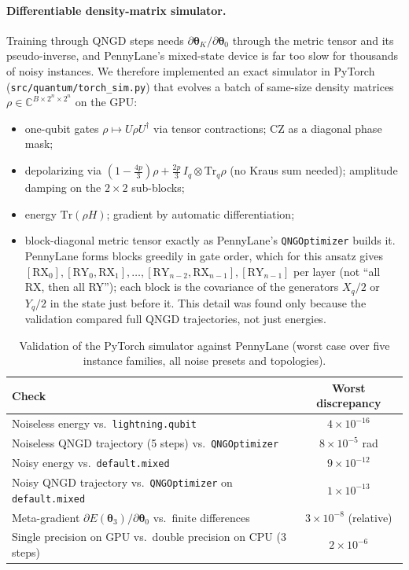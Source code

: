 \documentclass{ssnreview}
\begin{document}
\paragraph{Differentiable density-matrix simulator.} Training through QNGD steps needs
$\partial\boldsymbol\theta_K/\partial\boldsymbol\theta_0$ through the metric tensor and its
pseudo-inverse, and PennyLane's mixed-state device is far too slow for thousands of noisy
instances. We therefore implemented an exact simulator in PyTorch
(\texttt{src/quantum/torch\_sim.py}) that evolves a batch of same-size density matrices
$\rho\in\mathbb{C}^{B\times2^n\times2^n}$ on the GPU:
\begin{itemize}
  \item one-qubit gates $\rho\mapsto U\rho U^\dagger$ via tensor contractions; CZ as a diagonal
        phase mask;
  \item depolarizing via $(1-\tfrac{4p}{3})\rho + \tfrac{2p}{3}\,I_q\otimes\mathrm{Tr}_q\rho$ (no
        Kraus sum needed); amplitude damping on the $2\times2$ sub-blocks;
  \item energy $\mathrm{Tr}(\rho H)$; gradient by automatic differentiation;
  \item block-diagonal metric tensor exactly as PennyLane's \texttt{QNGOptimizer} builds it.
        PennyLane forms blocks greedily in gate order, which for this ansatz gives
        $[\text{RX}_0],[\text{RY}_0,\text{RX}_1],\dots,[\text{RY}_{n-2},\text{RX}_{n-1}],[\text{RY}_{n-1}]$
        per layer (not ``all RX, then all RY''); each block is the covariance of the generators
        $X_q/2$ or $Y_q/2$ in the state just before it. This detail was found only because the
        validation compared full QNGD trajectories, not just energies.
\end{itemize}

\begin{table}[H]
\centering
\caption{Validation of the PyTorch simulator against PennyLane (worst case over five instance
families, all noise presets and topologies).}\label{tab:validation}
\begin{tabular}{lc}
\toprule
Check & Worst discrepancy \\
\midrule
Noiseless energy vs.\ \texttt{lightning.qubit} & $4\times10^{-16}$ \\
Noiseless QNGD trajectory (5 steps) vs.\ \texttt{QNGOptimizer} & $8\times10^{-5}$ rad \\
Noisy energy vs.\ \texttt{default.mixed} & $9\times10^{-12}$ \\
Noisy QNGD trajectory vs.\ \texttt{QNGOptimizer} on \texttt{default.mixed} & $1\times10^{-13}$ \\
Meta-gradient $\partial E(\boldsymbol\theta_3)/\partial\boldsymbol\theta_0$ vs.\ finite differences & $3\times10^{-8}$ (relative) \\
Single precision on GPU vs.\ double precision on CPU (3 steps) & $2\times10^{-6}$ \\
\bottomrule
\end{tabular}
\end{table}
\end{document}
